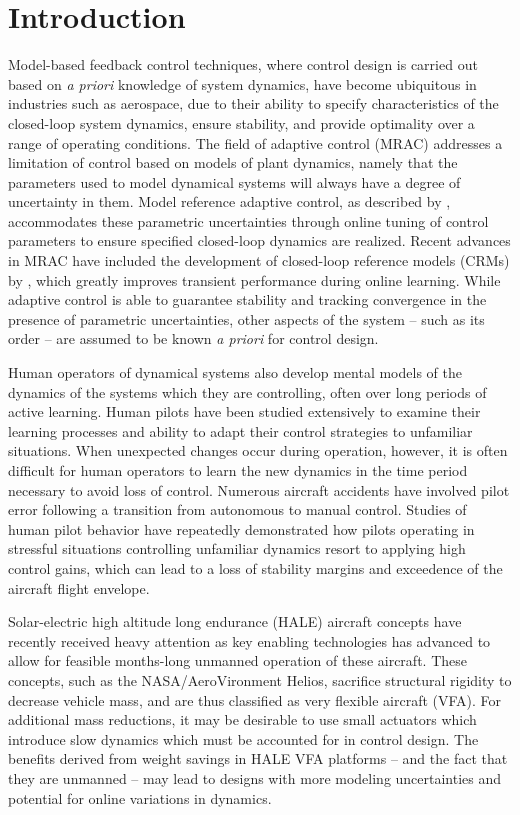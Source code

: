 \documentclass[english]{ifacconf}
\begin{document}
\section{Introduction}
Model-based feedback control techniques, where control design is carried out based on \textit{a priori} knowledge of system dynamics, have become ubiquitous in industries such as aerospace, due to their ability to specify characteristics of the closed-loop system dynamics, ensure stability, and provide optimality over a range of operating conditions. The field of adaptive control (MRAC) addresses a limitation of control based on models of plant dynamics, namely that the parameters used to model dynamical systems will always have a degree of uncertainty in them. Model reference adaptive control, as described by \cite{narendra2012stable}, accommodates these parametric uncertainties through online tuning of control parameters to ensure specified closed-loop dynamics are realized. Recent advances in MRAC have included the development of closed-loop reference models (CRMs) by \cite{gibson2013adaptive}, which greatly improves transient performance during online learning. While adaptive control is able to guarantee stability and tracking convergence in the presence of parametric uncertainties, other aspects of the system -- such as its order -- are assumed to be known \textit{a priori} for control design.

Human operators of dynamical systems also develop mental models of the dynamics of the systems which they are controlling, often over long periods of active learning. Human pilots have been studied extensively to examine their learning processes and ability to adapt their control strategies to unfamiliar situations. When unexpected changes occur during operation, however, it is often difficult for human operators to learn the new dynamics in the time period necessary to avoid loss of control. Numerous aircraft accidents have involved pilot error following a transition from autonomous to manual control. Studies of human pilot behavior have repeatedly demonstrated how pilots operating in stressful situations controlling unfamiliar dynamics resort to applying high control gains, which can lead to a loss of stability margins and exceedence of the aircraft flight envelope. 

Solar-electric high altitude long endurance (HALE) aircraft concepts have recently received heavy attention as key enabling technologies has advanced to allow for feasible months-long unmanned operation of these aircraft. These concepts, such as the NASA/AeroVironment Helios, sacrifice structural rigidity to decrease vehicle mass, and are thus classified as very flexible aircraft (VFA). For additional mass reductions, it may be desirable to use small actuators which introduce slow dynamics which must be accounted for in control design. The benefits derived from weight savings in HALE VFA platforms -- and the fact that they are unmanned -- may lead to designs with more modeling uncertainties and potential for online variations in dynamics.
\end{document}
